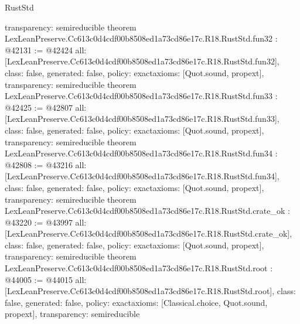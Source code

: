 \begin{lexlean}{RustStd}
\begin{coremodule}
{  transparency: semireducible
}
theorem LexLeanPreserve.Cc613c0d4cdf00b8508ed1a73cd86e17c.R18.RustStd.fun32 : @42131 := @42424 {
  all: [LexLeanPreserve.Cc613c0d4cdf00b8508ed1a73cd86e17c.R18.RustStd.fun32],
  class: false,
  generated: false,
  policy: exact{axioms: [Quot.sound, propext]},
  transparency: semireducible
}
theorem LexLeanPreserve.Cc613c0d4cdf00b8508ed1a73cd86e17c.R18.RustStd.fun33 : @42425 := @42807 {
  all: [LexLeanPreserve.Cc613c0d4cdf00b8508ed1a73cd86e17c.R18.RustStd.fun33],
  class: false,
  generated: false,
  policy: exact{axioms: [Quot.sound, propext]},
  transparency: semireducible
}
theorem LexLeanPreserve.Cc613c0d4cdf00b8508ed1a73cd86e17c.R18.RustStd.fun34 : @42808 := @43216 {
  all: [LexLeanPreserve.Cc613c0d4cdf00b8508ed1a73cd86e17c.R18.RustStd.fun34],
  class: false,
  generated: false,
  policy: exact{axioms: [Quot.sound, propext]},
  transparency: semireducible
}
theorem LexLeanPreserve.Cc613c0d4cdf00b8508ed1a73cd86e17c.R18.RustStd.crate_ok : @43220 := @43997 {
  all: [LexLeanPreserve.Cc613c0d4cdf00b8508ed1a73cd86e17c.R18.RustStd.crate_ok],
  class: false,
  generated: false,
  policy: exact{axioms: [Quot.sound, propext]},
  transparency: semireducible
}
theorem LexLeanPreserve.Cc613c0d4cdf00b8508ed1a73cd86e17c.R18.RustStd.root : @44005 := @44015 {
  all: [LexLeanPreserve.Cc613c0d4cdf00b8508ed1a73cd86e17c.R18.RustStd.root],
  class: false,
  generated: false,
  policy: exact{axioms: [Classical.choice, Quot.sound, propext]},
  transparency: semireducible
}


\end{coremodule}
\end{lexlean}
